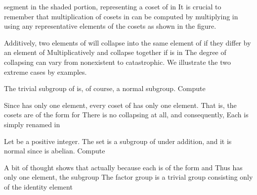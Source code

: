 \documentclass[11pt,oneside]{article}
\begin{document}
\BookNarrativetrue

\begin{BookBody}

\noindent segment in the shaded portion, representing a coset of  in  It is crucial to remember that multiplication of cosets in  can be computed by multiplying in  using any representative elements of the cosets as shown in the figure.

Additively, two elements of  will collapse into the same element of  if they differ by an element of  Multiplicatively and  collapse together if  is in  The degree of collapsing can vary from nonexistent to catastrophic. We illustrate the two extreme cases by examples.

 The trivial subgroup  of  is, of course, a normal subgroup. Compute 

 Since  has only one element, every coset of  has only one element. That is, the cosets are of the form  for  There is no collapsing at all, and consequently,  Each  is simply renamed  in \BookEnd{\blacktriangle}

 Let  be a positive integer. The set  is a subgroup of  under addition, and it is normal since  is abelian. Compute 

 A bit of thought shows that actually  because each  is of the form  and  Thus  has only one element, the subgroup  The factor group is a trivial group consisting only of the identity element\BookEnd{\blacktriangle}


\end{BookBody}
\end{document}
